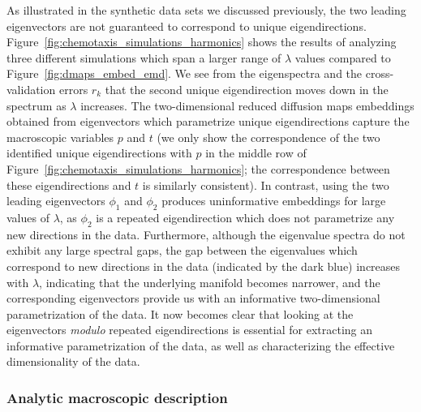 \documentclass[3p]{elsarticle}
\begin{document}
As illustrated in the synthetic data sets we discussed previously, the two leading eigenvectors are not 
guaranteed to correspond to unique eigendirections.
%
Figure~\ref{fig:chemotaxis_simulations_harmonics} shows the results of analyzing three different simulations 
which span a larger range of $\lambda$ values compared to Figure~\ref{fig:dmaps_embed_emd}.
%
We see from the eigenspectra and the cross-validation errors $r_k$ that the second unique eigendirection moves 
down in the spectrum as $\lambda$ increases.
%
The two-dimensional reduced diffusion maps embeddings obtained from eigenvectors which parametrize unique eigendirections 
capture the macroscopic variables $p$ and $t$ (we only show the correspondence of the two identified unique eigendirections 
with $p$ in the middle row of Figure~\ref{fig:chemotaxis_simulations_harmonics}; the correspondence 
between these eigendirections and $t$ is similarly consistent).
%
In contrast, using the two leading eigenvectors $\phi_1$ and $\phi_2$ produces 
uninformative embeddings for large values of $\lambda$, as $\phi_2$ is a repeated eigendirection which 
does not parametrize any new directions in the data.
%
Furthermore, although the eigenvalue spectra do not exhibit any large spectral gaps, 
the gap between the eigenvalues which correspond to new directions in the data (indicated by the dark blue) increases with $\lambda$, 
indicating that the underlying manifold becomes narrower, and the corresponding eigenvectors 
provide us with an informative two-dimensional parametrization of the data. %
%
It now becomes clear that looking at the eigenvectors {\em modulo} repeated eigendirections is essential for extracting an informative parametrization of the data, as well as characterizing the effective dimensionality of the data.

\subsubsection{Analytic macroscopic description}
\end{document}
